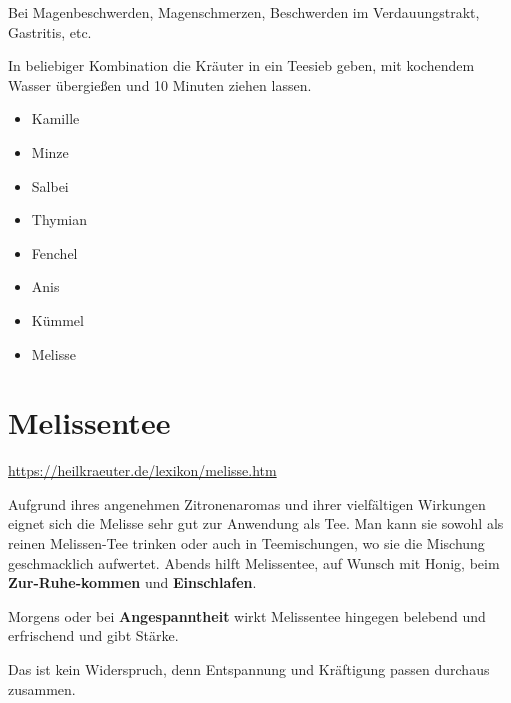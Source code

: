    


Bei Magenbeschwerden, Magenschmerzen, Beschwerden im Verdauungstrakt, Gastritis, etc.


In beliebiger Kombination die Kräuter in ein Teesieb geben, mit kochendem Wasser übergießen und 10 Minuten ziehen lassen.

\begin{itemize}
	\item Kamille
	\item Minze
	\item Salbei
	\item Thymian
	\item Fenchel
	\item Anis
	\item Kümmel
	\item Melisse
\end{itemize}



\newpage


\section{Melissentee}
\label{   }

\cite{heilkraeuterlexikon}  

\url{https://heilkraeuter.de/lexikon/melisse.htm}

           


Aufgrund ihres angenehmen Zitronenaromas und ihrer vielfältigen Wirkungen eignet sich die Melisse sehr gut zur Anwendung als Tee. Man kann sie sowohl als reinen Melissen-Tee trinken oder auch in Teemischungen, wo sie die Mischung geschmacklich aufwertet.
Abends hilft Melissentee, auf Wunsch mit Honig, beim \textbf{Zur-Ruhe-kommen} und \textbf{Einschlafen}.

Morgens oder bei \textbf{Angespanntheit} wirkt Melissentee hingegen belebend und erfrischend und gibt Stärke.

Das ist kein Widerspruch, denn Entspannung und Kräftigung passen durchaus zusammen.

